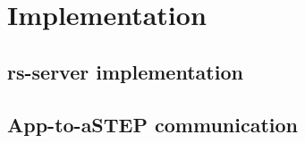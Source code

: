 \section{Implementation}

\subsection{\gls{rs}-server implementation}


\subsection{App-to-aSTEP communication}

